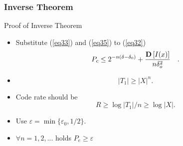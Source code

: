 \documentclass[14pt]{beamer}
\begin{document}
\begin{frame}
\frametitle{Inverse Theorem}
Proof of Inverse Theorem
\begin{itemize}

    \item Substitute (\ref{eq33}) and (\ref{eq35}) to (\ref{eq32})
    \begin{equation}
    \label{eq36}
    P_c \le 2^{ - n(\delta - \delta _0 )} + \frac{{\rm {\bf D}}\left[ {I(x)}
    \right]}{n\delta _o^2 } \quad .
    \end{equation}

    \item 
    \[
    \vert T_1 \vert \ge { \vert X \vert}^n.
    \]

    \item Code rate should be
    \begin{equation}
    R \geq  \log \vert T_1 \vert /n \geq \log\vert X \vert.
    \label{eq361}
    \end{equation}

    \item Use $\varepsilon = \min \{\varepsilon_0 ,1 / 2\}.$ 
    
    \item $\forall n = 1,2,...$ holds $P_e \ge \varepsilon $
    
\end{itemize}
\end{frame}

\end{document}
